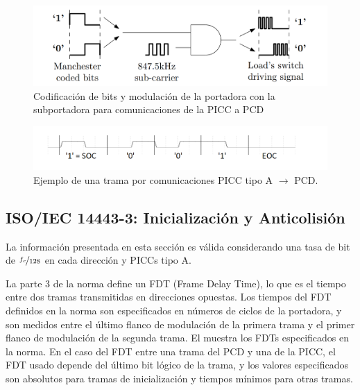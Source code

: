 \documentclass[a4paper, twoside, 11pt]{report}
\begin{document}
\begin{figure}[htb]
  \centering
  \includegraphics[scale=0.35]{./img/picc_to_pcd}
  \caption{Codificación de bits y modulación de la portadora con la subportadora para comunicaciones de la PICC a PCD~\cite{fabricio_eamta}}
  \label{fig:picc_to_pcd}
\end{figure}

\begin{figure}[htb]
  \centering
  \includegraphics[scale=0.5]{./img/tx_frame_example}
  \caption{Ejemplo de una trama por comunicaciones PICC tipo A $\rightarrow$ PCD.}
  \label{fig:tx_frame_example}
\end{figure}

\FloatBarrier
\subsection{ISO/IEC 14443-3: \large{Inicialización y Anticolisión}}
\label{sec:introduction_iso14443-3}

La información presentada en esta sección es válida considerando una tasa de bit de $\nicefrac{f_c}{128}$ en cada dirección y PICCs tipo A.

La parte 3 de la norma define un FDT (Frame Delay Time), lo que es el tiempo entre dos tramas transmitidas en direcciones opuestas. Los tiempos del FDT definidos en la norma son especificados en números de ciclos de la portadora, y son medidos entre el último flanco de modulación de la primera trama y el primer flanco de modulación de la segunda trama. El  muestra los FDTs especificados en la norma. En el caso del FDT entre una trama del PCD y una de la PICC, el FDT usado depende del último bit lógico de la trama, y los valores especificados son absolutos para tramas de inicialización y tiempos mínimos para otras tramas.
\end{document}
